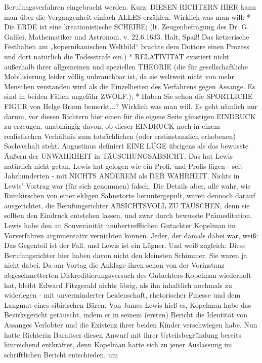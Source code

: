 \begin{multicols}{2}
{Berufungsverfahren eingebracht werden.
Kurz: DIESEN RICHTERN HIER kann man über die Vergangenheit einfach ALLES erzählen. Wirklich was man
will:
* Die ERDE ist eine kreationistische SCHEIBE; (lt. Zeugenbefragung des Dr. G. Galilei, Mathematiker und Astronom, v. 22.6.1633. Halt, Spaß! Das ketzerische Festhalten am „kopernikanischen Weltbild“ brachte dem Dottore einen Prozess und dort natürlich die Todesstrafe ein.)\textCR
* RELATIVITÄT existiert nicht außerhalb ihrer allgemeinen und speziellen THEORIE (die für gesellschaftliche Mobilisierung leider völlig unbrauchbar ist, da sie weltweit nicht von mehr Menschen verstanden wird als die Einzelheiten des Verfahrens gegen Assange. Es sind in beiden Fällen ungefähr ZWÖLF.);\textCR
* Haben Sie schon die SPORTLICHE FIGUR von Helge Braun bemerkt...?\textCR
Wirklich was man will. Es geht nämlich nur darum, vor
diesen Richtern hier einen für die eigene Seite günstigen
EINDRUCK zu erzeugen, unabhängig davon, ob dieser
EINDRUCK noch in einem realistischen Verhältnis zum
tatsächlichen (oder erstinstanzlich erhobenen) Sachverhalt steht.\textCR
Augustinus definiert EINE LÜGE übrigens als das bewusste Äußern der UNWAHRHEIT in TÄUSCHUNGSABSICHT. Das hat Lewis natürlich nicht getan. Lewis hat
gelogen wie ein Profi, und Profis lügen - seit Jahrhunderten - mit NICHTS ANDEREM als DER WAHRHEIT.
Nichts in Lewis’ Vortrag war (für sich genommen) falsch.
Die Details aber, alle wahr, wie Rumkirschen von einer
ekligen Sahnetorte heruntergepult, waren dennoch darauf ausgerichtet, die Berufungsrichter ABSICHTSVOLL ZU TÄUSCHEN, denn sie sollten den Eindruck entstehen lassen, und zwar durch bewusste Prämeditation,
Lewis habe den an Souveränität unübertrefflichen Gutachter Kopelman im Vorverfahren argumentativ vernichten können. Jeder, der damals dabei war, weiß: Das
Gegenteil ist der Fall, und Lewis ist ein Lügner. Und weiß
zugleich: Diese Berufungsrichter hier haben davon nicht
den kleinsten Schimmer. Sie waren ja nicht dabei.\textCR
Da am Vortag die Anklage ihren schon von der Vorinstanz
abgeschmetterten Diskreditierungsversuch des Gutachters Kopelman wiederholt hat, bleibt Edward Fitzgerald
nichts übrig, als ihn inhaltlich nochmals zu widerlegen
- mit unverminderter Leidenschaft, rhetorischer Finesse
und dem Langmut eines sibirischen Bären. Von James
Lewis hieß es, Kopelman habe das Bezirksgericht getäuscht, indem er in seinem (ersten) Bericht die Identität von Assanges Verlobter und die Existenz ihrer beiden
Kinder verschwiegen habe. Nun hatte Richterin Baraitser diesen Anwurf mit ihrer Urteilsbegründung bereits
hinreichend entkräftet, denn Kopelman hatte sich zu jener Auslassung im schriftlichen Bericht entschieden, um
}
\end{multicols}
